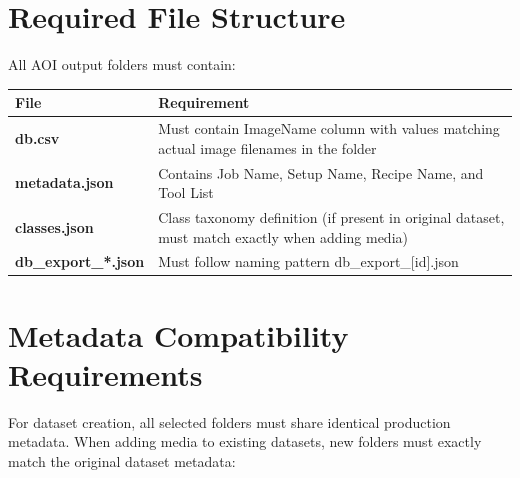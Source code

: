 \documentclass[
  11pt,
  a4paper,
  11pt,
  oneside]{report}
\renewcommand{\toprule}{\hline}
\renewcommand{\midrule}{\hline}
\renewcommand{\bottomrule}{\hline}
\begin{document}
\section{Required File Structure}\label{required-file-structure}

All AOI output folders must contain:

\begin{longtable}[]{@{}
  >{\raggedright\arraybackslash}p{}
  >{\raggedright\arraybackslash}p{}@{}}
\toprule\noalign{}
\begin{minipage}[b]{\linewidth}\raggedright
\textbf{File}
\end{minipage} & \begin{minipage}[b]{\linewidth}\raggedright
\textbf{Requirement}
\end{minipage} \\
\midrule\noalign{}
\endhead
\bottomrule\noalign{}
\endlastfoot
\textbf{db.csv} & Must contain ImageName column with values matching
actual image filenames in the folder \\
\textbf{metadata.json} & Contains Job Name, Setup Name, Recipe Name, and
Tool List \\
\textbf{classes.json} & Class taxonomy definition (if present in
original dataset, must match exactly when adding media) \\
\textbf{db\_export\_*.json} & Must follow naming pattern
db\_export\_{[}id{]}.json \\
\end{longtable}

\section{Metadata Compatibility
Requirements}\label{metadata-compatibility-requirements}

For dataset creation, all selected folders must share identical
production metadata. When adding media to existing datasets, new folders
must exactly match the original dataset metadata:
\end{document}
